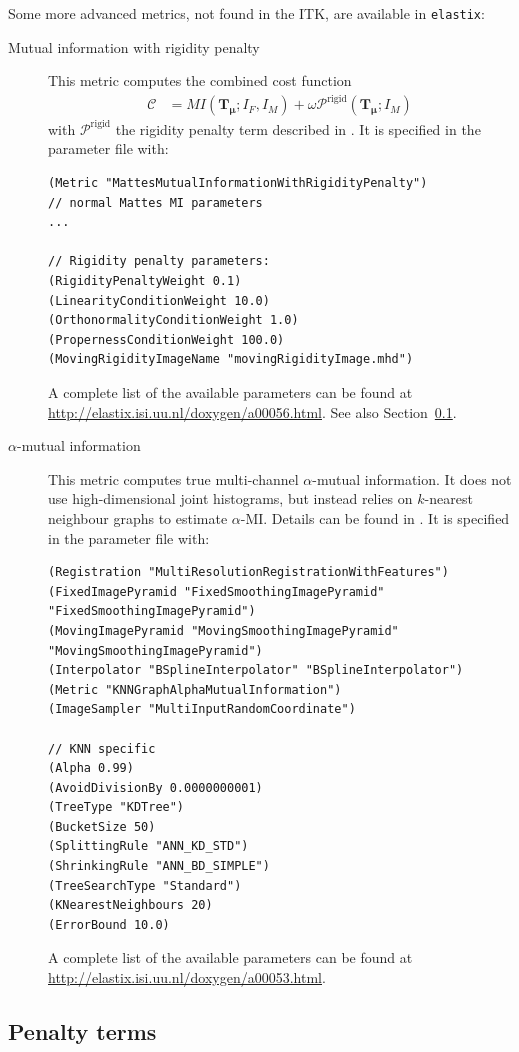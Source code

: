 \documentclass[]{report}
\newcommand{\elastix}{\texttt{elastix}}
\newcommand{\vmu}{\bm{\mu}}
\newcommand{\vTm}{\bm{T}_{\vmu}}
\newcommand{\CC}{\mathcal{C}}
\begin{document}
Some more advanced metrics, not found in the ITK, are available in
\elastix:
\begin{description}
\item[Mutual information with rigidity penalty] This metric computes the combined
cost function
\begin{align}
\CC &= \mathit{MI}(\vTm;I_F,I_M) + \omega
\mathcal{P}^{\mathrm{rigid}}(\vTm;I_M)
\end{align}
with $\mathcal{P}^{\mathrm{rigid}}$ the rigidity penalty term
described in \cite{Staring07}. It is specified in the parameter file
with: \small
\begin{verbatim}
(Metric "MattesMutualInformationWithRigidityPenalty")
// normal Mattes MI parameters
...

// Rigidity penalty parameters:
(RigidityPenaltyWeight 0.1)
(LinearityConditionWeight 10.0)
(OrthonormalityConditionWeight 1.0)
(PropernessConditionWeight 100.0)
(MovingRigidityImageName "movingRigidityImage.mhd")
\end{verbatim}
\normalsize A complete list of the available parameters can be found at
\url{http://elastix.isi.uu.nl/doxygen/a00056.html}. See also
Section~\ref{sec:penaltyterms}.

\item[$\alpha$-mutual information] This metric computes true multi-channel
$\alpha$-mutual information. It does not use high-dimensional joint
histograms, but instead relies on $k$-nearest neighbour graphs to
estimate $\alpha$-MI. Details can be found in \cite{Staring09}. It
is specified in the parameter file with: \small
\begin{verbatim}
(Registration "MultiResolutionRegistrationWithFeatures")
(FixedImagePyramid "FixedSmoothingImagePyramid" "FixedSmoothingImagePyramid")
(MovingImagePyramid "MovingSmoothingImagePyramid" "MovingSmoothingImagePyramid")
(Interpolator "BSplineInterpolator" "BSplineInterpolator")
(Metric "KNNGraphAlphaMutualInformation")
(ImageSampler "MultiInputRandomCoordinate")

// KNN specific
(Alpha 0.99)
(AvoidDivisionBy 0.0000000001)
(TreeType "KDTree")
(BucketSize 50)
(SplittingRule "ANN_KD_STD")
(ShrinkingRule "ANN_BD_SIMPLE")
(TreeSearchType "Standard")
(KNearestNeighbours 20)
(ErrorBound 10.0)
\end{verbatim}
\normalsize A complete list of the available parameters can be found
at \url{http://elastix.isi.uu.nl/doxygen/a00053.html}.
\end{description}

\subsection{Penalty terms}\label{sec:penaltyterms}
\end{document}
